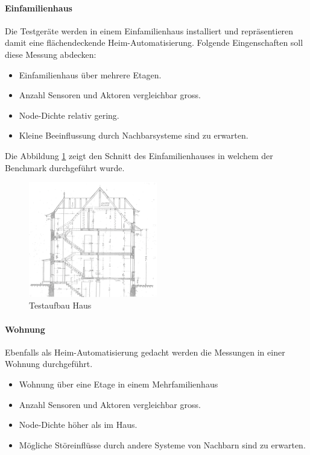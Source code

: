 \paragraph{Einfamilienhaus}
Die Testgeräte werden in einem Einfamilienhaus installiert und repräsentieren damit eine flächendeckende Heim-Automatisierung. Folgende Eingenschaften soll diese Messung abdecken:
\begin{itemize}
	\item Einfamilienhaus über mehrere Etagen.
	\item Anzahl Sensoren und Aktoren vergleichbar gross.
	\item Node-Dichte relativ gering.
	\item Kleine Beeinflussung durch Nachbarsysteme sind zu erwarten.
\end{itemize}

Die Abbildung \ref{fig:TestaufbauHaus} zeigt den Schnitt des Einfamilienhauses in welchem der Benchmark durchgeführt wurde.

\begin{figure}
	\centering
	\includegraphics[width=0.5\textwidth]{graphics/Testaufbau_Haus_Schnitt.png}
	\caption{Testaufbau Haus}
	\label{fig:TestaufbauHaus}
\end{figure}

\paragraph{Wohnung}
Ebenfalls als Heim-Automatisierung gedacht werden die Messungen in einer Wohnung durchgeführt.
\begin{itemize}
	\item Wohnung über eine Etage in einem Mehrfamilienhaus
	\item Anzahl Sensoren und Aktoren vergleichbar gross.
	\item Node-Dichte höher als im Haus.
	\item Mögliche Störeinflüsse durch andere Systeme von Nachbarn sind zu erwarten.
\end{itemize}


